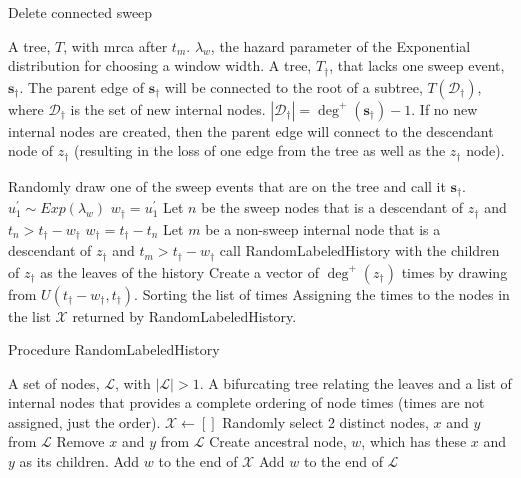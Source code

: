 \documentclass[letterpaper]{article}
\newcommand{\sweep}[1]{{\ensuremath{\mathbf{s}_{#1}}}}
\newcommand{\sweeptime}[1]{{\ensuremath{t_{#1}}}}
\newcommand{\sweeploc}[1]{{\ensuremath{z_{#1}}}}
\newcommand{\outdegree}[1]{{\ensuremath{\deg^{+}\left(#1\right)}}}
\begin{document}
\begin{algorithm} 
\caption{Delete connected sweep}
\label{dcs}
\begin{algorithmic}[1]
	\REQUIRE A tree, $T$, with mrca after  $t_m$.
	\REQUIRE $\lambda_w$, the hazard parameter of the Exponential distribution for choosing a window width.
	\ENSURE A tree, $T_{\dag}$, that lacks one sweep event, $\sweep{\dag}$. The parent edge of $\sweep{\dag}$ will be connected to the root of a  subtree, $T(\mathcal{D}_{\dag})$, where $\mathcal{D}_{\dag}$ is the set of new internal nodes.
	$|\mathcal{D}_{\dag}| = \outdegree{\sweep{\dag}}-1$. If no new internal nodes are created, then the parent edge will connect to the descendant node of $\sweeploc{\dag}$ (resulting in the loss of one edge from the tree as well as the $\sweeploc{\dag}$ node).
	
	\ENDIF
	\STATE Randomly draw one of the sweep events that are on the tree and call it $\sweep{\dag}$.
	\STATE $u_1^{\prime} \sim Exp(\lambda_w)$
	\STATE $w_{\dag} = u_1^{\prime}$
	\STATE Let $n$ be the sweep nodes that is a descendant of $\sweeploc{\dag}$ and  $ t_n > \sweeptime{\dag} - w_{\dag}$
		\STATE $w_{\dag} = \sweeptime{\dag} - \sweeptime{n}$
	\ENDIF
	\STATE Let $m$ be a non-sweep internal node that is a descendant of $\sweeploc{\dag}$ and $ t_m > \sweeptime{\dag} -w_{\dag}$
	\ENDIF
	\STATE call {\sf RandomLabeledHistory} with the children of $\sweeploc{\dag}$ as the leaves of the history
	\STATE \label{newNodeHeights} Create a vector of $\outdegree{\sweeploc{\dag}}$ times by drawing from $U(\sweeptime{\dag}-w_{\dag}, \sweeptime{\dag})$.
	\STATE Sorting the list  of times
	\STATE Assigning the times to the nodes in the  list $\mathcal{X}$ returned by {\sf RandomLabeledHistory}.
	\ENDIF	
\end{algorithmic}
\end{algorithm} 


\begin{algorithm} 
\caption{Procedure {\sf RandomLabeledHistory}}
\label{rlh}
\begin{algorithmic}[1]
	\REQUIRE A set of nodes, $\mathcal{L}$, with $|\mathcal{L}| > 1$.
	\ENSURE A bifurcating tree relating the leaves and a list of internal nodes that provides a complete ordering of node times (times are not assigned, just the order).
	\STATE $\mathcal{X}\leftarrow []$
		\STATE Randomly select 2 distinct nodes, $x$ and $y$ from $\mathcal{L}$
		\STATE Remove $x$ and $y$ from $\mathcal{L}$
        \STATE Create ancestral node, $w$, which has these $x$ and $y$ as its children. 
        \STATE\label{needTimesList} Add $w$ to the end  of $\mathcal{X}$
        \STATE Add $w$ to the end  of $\mathcal{L}$
	\ENDWHILE
\end{algorithmic}
\end{algorithm} 
\end{document}
